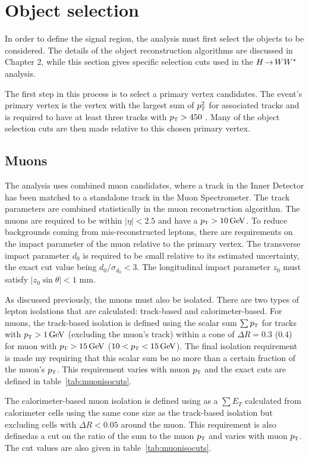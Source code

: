 \section{Object selection}

In order to define the signal region, the analysis must first select the objects to be considered. The details of the object reconstruction algorithms are discussed in Chapter 2, while this section gives specific selection cuts used in the $H{\,{\rightarrow}\,}WW^\ast$ analysis. 

The first step in this process is to select a primary vertex candidates. The event's primary vertex is the vertex with the largest sum of $p_{\textrm{\footnotesize\sc t}}^2$ for associated tracks and is required to have at least three tracks with $p_{\textrm{\footnotesize\sc t}} > 450$ \MeV. Many of the object selection cuts are then made relative to this chosen primary vertex.

\subsection{Muons}

The analysis uses combined muon candidates, where a track in the Inner Detector has been matched to a standalone track in the Muon Spectrometer. The track parameters are combined statistically in the muon reconstruction algorithm\cite{MuonReco}. The muons are required to be within $|\eta| < 2.5$ and have a $\pT > 10 \GeV$. To reduce backgrounds coming from mis-reconstructed leptons, there are requirements on the impact parameter of the muon relative to the primary vertex. The transverse impact parameter $d_0$ is required to be small relative to its estimated uncertainty, the exact cut value being $d_0/\sigma_{d_0} < 3$. The longitudinal impact parameter $z_0$ must satisfy $\left|z_0\sin\theta\right| < 1$ mm. 

As discussed previously, the muons must also be isolated. There are two types of lepton isolations that are calculated: track-based and calorimeter-based. For muons, the track-based isolation is defined using the scalar sum  $\sum p_{\textrm{\footnotesize\sc t}}$ for tracks with $\pT > 1 \GeV$ (excluding the muon's track) within a cone of  $\Delta R = 0.3$ ($0.4$) for muon with $\pT > 15 \GeV$ ($10 < \pT < 15 \GeV$). The final isolation requirement is made my requiring that this scalar sum be no more than a certain fraction of the muon's $p_{\textrm{\footnotesize\sc t}}$. This requirement varies with muon $p_{\textrm{\footnotesize\sc t}}$ and the exact cuts are defined in table~\ref{tab:muonisocuts}.

The calorimeter-based muon isolation is defined using as a $\sum E_{T}$ calculated from calorimeter cells using the same cone size as the track-based isolation but excluding cells with $\Delta R < 0.05$ around the muon. This requirement is also definedas a cut on the ratio of the sum to the muon $p_{\textrm{\footnotesize\sc t}}$ and varies with muon $p_{\textrm{\footnotesize\sc t}}$. The cut values are also given in table~\ref{tab:muonisocuts}.

